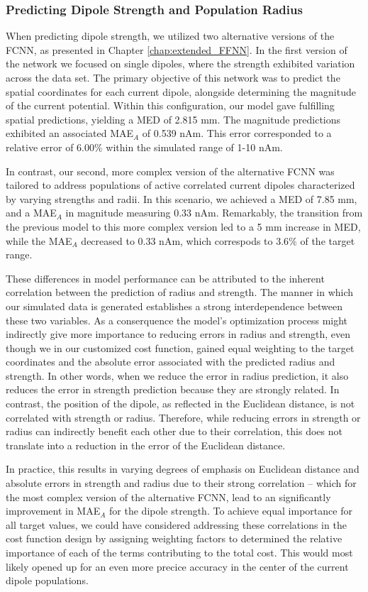 \documentclass[a4paper, UKenglish, 11pt]{uiomaster}
\begin{document}
\subsubsection{Predicting Dipole Strength and Population Radius}

When predicting dipole strength, we utilized two alternative versions of the FCNN, as presented in Chapter \ref{chap:extended_FFNN}. In the first version of the network we focused on single dipoles, where the strength exhibited variation across the data set. The primary objective of this network was to predict the spatial coordinates for each current dipole, alongside determining the magnitude of the current potential. Within this configuration, our model gave fulfilling spatial predictions, yielding a MED of 2.815 mm. The magnitude predictions exhibited an associated MAE$_{A}$ of 0.539 nAm. This error corresponded to a relative error of 6.00$\%$ within the simulated range of 1-10 nAm.

In contrast, our second, more complex version of the alternative FCNN was tailored to address populations of active correlated current dipoles characterized by varying strengths and radii. In this scenario, we achieved a MED of 7.85 mm, and a MAE$_A$ in magnitude measuring 0.33 nAm. Remarkably, the transition from the previous model to this more complex version led to a 5 mm increase in MED, while the MAE$_{A}$ decreased to 0.33 nAm, which correspods to 3.6$\%$ of the target range.

These differences in model performance can be attributed to the inherent correlation between the prediction of radius and strength. The manner in which our simulated data is generated establishes a strong interdependence between these two variables. As a conserquence the model's optimization process might indirectly give more importance to reducing errors in radius and strength, even though we in our customized cost function, gained equal weighting to the target coordinates and the absolute error associated with the predicted radius and strength. In other words, when we reduce the error in radius prediction, it also reduces the error in strength prediction because they are strongly related. In contrast, the position of the dipole, as reflected in the Euclidean distance, is not correlated with strength or radius. Therefore, while reducing errors in strength or radius can indirectly benefit each other due to their correlation, this does not translate into a reduction in the error of the Euclidean distance.

In practice, this results in varying degrees of emphasis on Euclidean distance and absolute errors in strength and radius due to their strong correlation -- which for the most complex version of the alternative FCNN, lead to an significantly improvement in MAE$_{A}$ for the dipole strength. To achieve equal importance for all target values, we could have considered addressing these correlations in the cost function design by assigning weighting factors to determined the relative importance of each of the terms contributing to the total cost. This would most likely opened up for an even more precice accuracy in the center of the current dipole populations.
\end{document}
